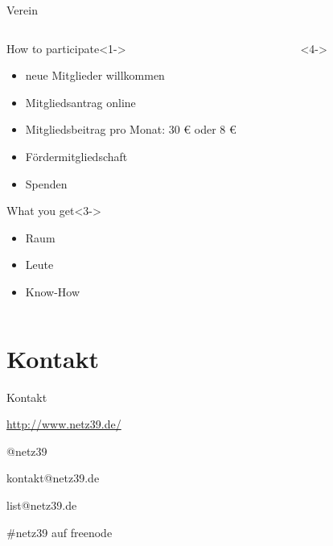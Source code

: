 \documentclass[hyperref={pdfpagelabels=false}]{beamer}
\begin{document}
\begin{frame}[label=secbaellebad]{Verein}
    \begin{columns}[b]
        \begin{column}{0.55\textwidth}
            \begin{block}{How to participate}<1->
                \begin{itemize}
                    \item neue Mitglieder willkommen
                    \item Mitgliedsantrag online
                    \item Mitgliedsbeitrag pro Monat: 30 € oder 8 €
                    \pause
                    \item Fördermitgliedschaft
                    \item Spenden
                \end{itemize}
            \end{block}
            \begin{block}{What you get}<3->
                \begin{itemize}
                    \item Raum
                    \item Leute
                    \item Know-How
                \end{itemize}
            \end{block}
        \end{column}
        \begin{column}{0.45\textwidth}<4->
            \begin{figure}
            \end{figure}
        \end{column}
    \end{columns}            
\end{frame}

\section{Kontakt}

\begin{frame}{Kontakt}
    \begin{center}
        \begin{description}
            \item[WWW] \url{http://www.netz39.de/}
            \item[Twitter/identi.ca] @netz39
            \item[E-Mail] kontakt@netz39.de
            \item[Mailingliste] list@netz39.de
            \item[IRC] \#netz39 auf freenode
        \end{description}
    \end{center}
\end{frame}
\end{document}
